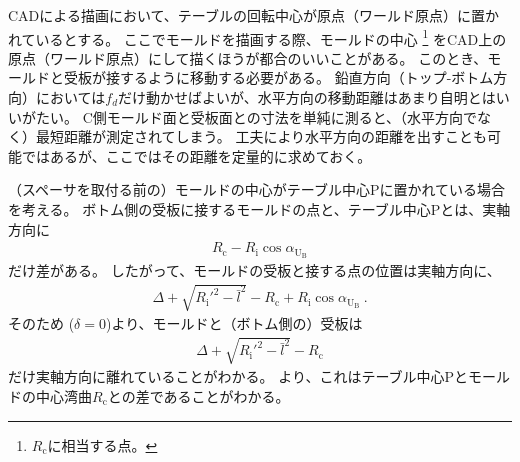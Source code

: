 


CADによる描画において、テーブルの回転中心が原点（ワールド原点）に置かれているとする。
ここでモールドを描画する際、モールドの中心
\footnote{$R_\mathrm c$に相当する点。}\relax
をCAD上の原点（ワールド原点）にして描くほうが都合のいいことがある。
このとき、モールドと受板が接するように移動する必要がある。
鉛直方向（トップ-ボトム方向）においては$f_d$だけ動かせばよいが、水平方向の移動距離はあまり自明とはいいがたい。
C側モールド面と受板面との寸法を単純に測ると、（水平方向でなく）最短距離が測定されてしまう。
工夫により水平方向の距離を出すことも可能ではあるが、ここではその距離を定量的に求めておく。



（スペーサを取付る前の）モールドの中心がテーブル中心Pに置かれている場合を考える。
ボトム側の受板に接するモールドの点と、テーブル中心Pとは、実軸方向に
\begin{align*}
  R_\mathrm c-R_\mathrm i\cos\alpha_{\mathrm U_\mathrm B}
\end{align*}
だけ差がある。
したがって、モールドの受板と接する点の位置は実軸方向に、
\begin{align*}
  \varDelta+\sqrt{R_\mathrm i'^2-\bar l^2}-R_\mathrm c+R_\mathrm i\cos\alpha_{\mathrm U_\mathrm B}\ .
\end{align*}
そのため ($\delta = 0$)より、モールドと（ボトム側の）受板は
\begin{align*}
  \varDelta+\sqrt{R_\mathrm i'^2-\bar l^2}-R_\mathrm c
\end{align*}
だけ実軸方向に離れていることがわかる。
より、これはテーブル中心Pとモールドの中心湾曲$R_\mathrm c$との差であることがわかる。



